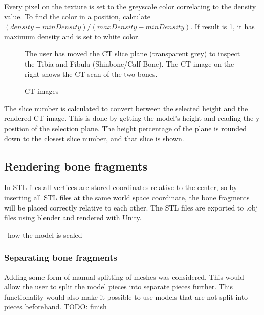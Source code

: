 \documentclass[a4paper]{report}
\begin{document}
Every pixel on the texture is set to the greyscale color correlating to the density value. To find the color in a position, calculate $(density-minDensity)/(maxDensity-minDensity)$. If result is 1, it has maximum density and is set to white color.

\begin{figure}[h!]
    \centering
	\hfill
  \caption{CT images}
  \small
  The user has moved the CT slice plane (transparent grey) to inspect the Tibia and Fibula (Shinbone/Calf Bone). The CT image on the right shows the CT scan of the two bones.
~\cite{mishra_virtual_2019}
\end{figure}

The slice number is calculated to convert between the selected height and the rendered CT image. This is done by getting the model's height and reading the y position of the selection plane. The height percentage of the plane is rounded down to the closest slice number, and that slice is shown.

\subsection{Rendering bone fragments}
In STL files all vertices are stored coordinates relative to the center, so by inserting all STL files at the same world space coordinate, the bone fragments will be placed correctly relative to each other. The STL files are exported to .obj files using blender and rendered with Unity.

--how the model is scaled

\subsubsection{Separating bone fragments}
Adding some form of manual splitting of meshes was considered. This would allow the user to split the model pieces into separate pieces further. This functionality would also make it possible to use models that are not split into pieces beforehand.
TODO: finish
\end{document}
